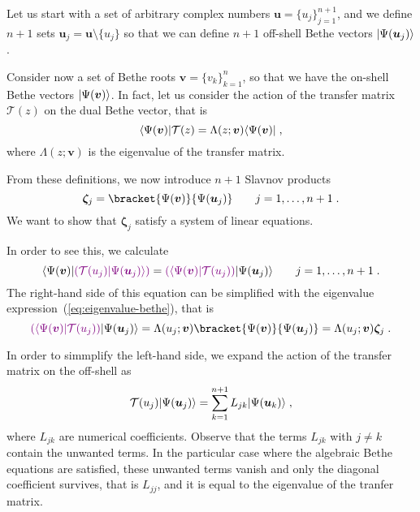 \documentclass[a4paper,11pt]{amsart}
\begin{document}
Let us start with a set of arbitrary complex numbers
\(\bm{u} = \{u_j\}_{j=1}^{n+1}\), and we define \(n+1\) sets
\(\bm{u}_j=\bm{u}\setminus \{u_j\}\) so that we can define
\(n+1\) off-shell Bethe vectors \(\lvert\Psi(\bm{u}_j)\rangle\). 

Consider now a set of Bethe roots \(\bm{v} = \{ v_k \}_{k=1}^n\),
so that we have the on-shell Bethe vectors \(\lvert\Psi(\bm{v})\rangle\). 
In fact, let us consider the action of the transfer matrix \(\mathcal{T}(z)\)
on the dual Bethe vector, that is 
\begin{equation}
\label{eq:eigenvalue-bethe}
\langle\Psi(\bm{v})\rvert\mathcal{T}(z) = \Lambda(z; \bm{v}) \langle\Psi(\bm{v})\rvert \; , 
\end{equation}
where \(\Lambda(z; \bm{v}) \) is the eigenvalue of the transfer matrix. 

From these definitions, we now introduce \(n+1\) Slavnov products 
\begin{equation}
  \bm{\zeta}_j = \bracket{\Psi(\bm{v})}{\Psi(\bm{u}_j)}\qquad j =1, \dots, n+1\; .
\end{equation}
We want to show that \(\bm{\zeta}_j\) satisfy a system of linear equations.

In order to see this, we calculate
\begin{equation}
  \langle\Psi(\bm{v})\rvert {\color{violet}\left(\mathcal{T}(u_j)\lvert\Psi(\bm{u}_j)\rangle \right)} =
  {\color{violet}\left(\langle\Psi(\bm{v})\rvert\mathcal{T}(u_j)\right)}\lvert\Psi(\bm{u}_j)\rangle 
  \qquad j =1, \dots, n+1\; .
\end{equation}
The right-hand side of this equation can be simplified with the eigenvalue
expression~(\ref{eq:eigenvalue-bethe}), that is
\begin{equation}
  {\color{violet}\left(\bra{\Psi(\bm{v})}\mathcal{T}(u_j)\right)}\ket{\Psi(\bm{u}_j)}  =
\Lambda(u_j; \bm{v}) \bracket{\Psi(\bm{v})}{\Psi(\bm{u}_j)} = 
\Lambda(u_j; \bm{v}) \bm{\zeta}_j\; . 
\end{equation}

In order to simmplify the left-hand side, we expand the action of the transfer matrix on
the off-shell as
\begin{equation}
  \mathcal{T}(u_j)\lvert\Psi(\bm{u}_j)\rangle  = \sum_{k=1}^{n+1} L_{jk} \lvert\Psi(\bm{u}_k)\rangle \; ,
\end{equation}
where \(L_{jk}\) are numerical coefficients. Observe that the terms \(L_{jk}\) with
\(j\neq k\) contain the unwanted terms. In the particular case where the algebraic
Bethe equations are satisfied, these unwanted terms vanish and only the diagonal
coefficient survives, that is \(L_{jj}\), and it is equal to the eigenvalue of the
tranfer matrix. 
\end{document}
